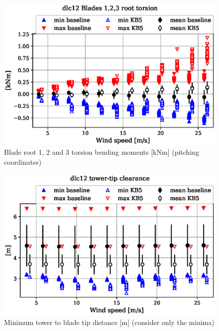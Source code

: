 \begin{figure}[!ht]
\begin{center}
	\includegraphics[width=.85\linewidth]{figures/baseline-vs-KB6/dlc12/blade1-blade1-node-001-momentvec-z_AA0008_AA0008.eps}
\end{center}
\caption{Blade root 1, 2 and 3 torsion bending moments [kNm] (pitching coordinates)}
\label{fig:baseline-vs-KB6:dlc12:blade-root-torsion}
\end{figure}

\begin{figure}[!ht]
\begin{center}
	\includegraphics[width=.85\linewidth]{figures/baseline-vs-KB6/dlc12/DLL-towerclearance_mblade-inpvec-1_AA0008_AA0008.eps}
\end{center}
\caption{Minimum tower to blade tip distance [m] (consider only the minima)}
\label{fig:baseline-vs-KB6:dlc12:tower-tip-clearance}
\end{figure}

